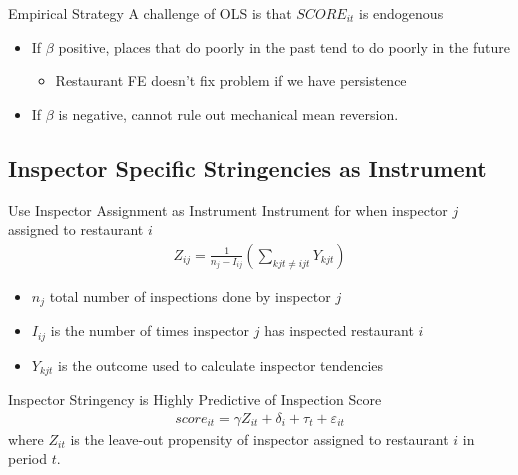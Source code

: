 \documentclass[handout]{beamer}
\begin{document}
\begin{frame}{Empirical Strategy}
A challenge of OLS is that $SCORE_{it}$ is endogenous
\begin{itemize}
\item If $\beta$ positive, places that do poorly in the past tend to do poorly in the future
\begin{itemize}
\item Restaurant FE doesn't fix problem if we have persistence
\end{itemize}
\item If $\beta$ is negative, cannot rule out mechanical mean reversion.  
\end{itemize}
\end{frame}

\subsection{Inspector Specific Stringencies as Instrument}
\begin{frame}{Use Inspector Assignment as Instrument}
Instrument for when inspector $j$ assigned to restaurant $i$
    \begin{align*}
        Z_{ij} = \frac{1}{n_j - I_{ij}} \left( \sum_{kjt\neq ijt}   Y_{kjt}\right)
    \end{align*}
    \begin{itemize}
    \item $n_j$ total number of inspections done by inspector $j$
    \item $I_{ij}$ is the number of times inspector $j$ has inspected restaurant $i$
    \item $Y_{kjt}$ is the outcome used to calculate inspector tendencies
    \end{itemize}
\end{frame}

\begin{frame}{Inspector Stringency is Highly Predictive of Inspection Score}
\begin{align*}
    score_{it} = \gamma Z_{it} + \delta_i + \tau_t + \varepsilon_{it}
\end{align*}
\footnotesize{where $Z_{it}$ is the leave-out propensity of inspector assigned to restaurant $i$ in period $t$.}
\begin{table}[h!]
\centering
\scalebox{0.8}{ }
\label{first_stage_reg}
\end{table}
\end{frame}
\end{document}
